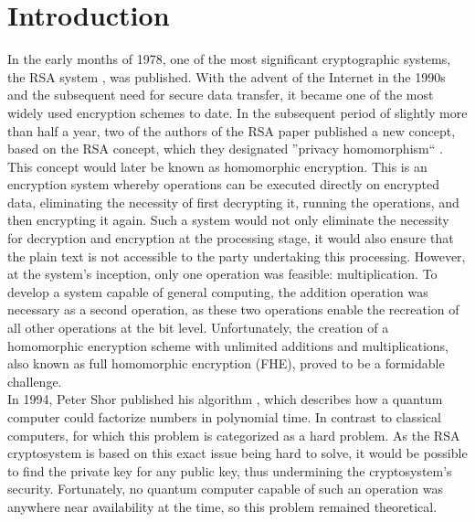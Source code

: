 \chapter{Introduction}
\label{Introduction}


In the early months of 1978, one of the most significant cryptographic systems, the RSA system \cite{RSA}, was published. With the advent of the Internet in the 1990s and the subsequent need for secure data transfer, it became one of the most widely used encryption schemes to date. In the subsequent period of slightly more than half a year, two of the authors of the RSA paper published a new concept, based on the RSA concept, which they designated ''privacy homomorphism`` \cite{Rivest1978}. This concept would later be known as homomorphic encryption. This is an encryption system whereby operations can be executed directly on encrypted data, eliminating the necessity of first decrypting it, running the operations, and then encrypting it again. Such a system would not only eliminate the necessity for decryption and encryption at the processing stage, it would also ensure that the plain text is not accessible to the party undertaking this processing. However, at the system's inception, only one operation was feasible: multiplication. To develop a system capable of general computing, the addition operation was necessary as a second operation, as these two operations enable the recreation of all other operations at the bit level. Unfortunately, the creation of a homomorphic encryption scheme with unlimited additions and multiplications, also known as full homomorphic encryption (FHE), proved to be a formidable challenge.\\
In 1994, Peter Shor published his algorithm \cite{Shor}, which describes how a quantum computer could factorize numbers in polynomial time. In contrast to classical computers, for which this problem is categorized as a hard problem. As the RSA cryptosystem is based on this exact issue being hard to solve, it would be possible to find the private key for any public key, thus undermining the cryptosystem's security. Fortunately, no quantum computer capable of such an operation was anywhere near availability at the time, so this problem remained theoretical.\\
